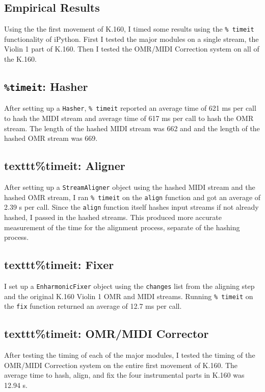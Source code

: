\subsection{Empirical Results}
Using the the first movement of K.160, I timed some results using the \texttt{\% timeit} functionality of iPython. First I tested the major modules on a single stream, the Violin 1 part of K.160. Then I tested the OMR/MIDI Correction system on all of the K.160.

\subsection{\texttt{\%timeit}: Hasher}
After setting up a \texttt{Hasher}, \texttt{\% timeit}  reported an average time of 621 ms per call to hash the MIDI stream and average time of 617 ms per call to hash the OMR stream. The length of the hashed MIDI stream was 662 and and the length of the hashed OMR stream was 669. 

\subsection{texttt{\%timeit}: Aligner}
After setting up a \texttt{StreamAligner} object using the hashed MIDI stream and the hashed OMR stream, I ran \texttt{\% timeit} on the \texttt{align} function and got an average of 2.39 s per call. Since the \texttt{align} function itself hashes input streams if not already hashed, I passed in the hashed streams. This produced more accurate measurement of the time for the alignment process, separate of the hashing process.

\subsection{texttt{\%timeit}: Fixer}
I set up a \texttt{EnharmonicFixer} object using the \texttt{changes} list from the aligning step and the original K.160 Violin 1 OMR and MIDI streams. Running \texttt{\% timeit} on the \texttt{fix} function returned an average of 12.7 ms per call. 

\subsection{texttt{\%timeit}: OMR/MIDI Corrector}
After testing the timing of each of the major modules, I tested the timing of the OMR/MIDI Correction system on the entire first movement of K.160. The average time to hash, align, and fix the four instrumental parts in K.160 was 12.94 s. 

